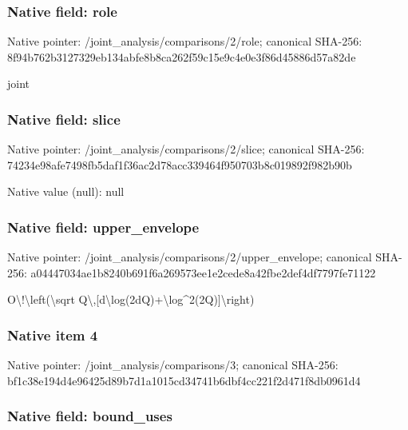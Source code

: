 \documentclass[10pt,a4paper]{article}
\begin{document}
\subsubsection{Native field: role}


Native pointer: /joint\_analysis/comparisons/2/role; canonical SHA-256: 8f94b762b3127329eb134abf\allowbreak{}e8b8ca262f59c15e9c4e0e3f\allowbreak{}86d45886d57a82de


joint


\subsubsection{Native field: slice}


Native pointer: /joint\_analysis/comparisons/2/slice; canonical SHA-256: 74234e98afe7498fb5daf1f3\allowbreak{}6ac2d78acc339464f950703b\allowbreak{}8c019892f982b90b



Native value (null): null



\subsubsection{Native field: upper\_envelope}


Native pointer: /joint\_analysis/comparis\allowbreak{}ons/2/upper\_envelope; canonical SHA-256: a04447034ae1b8240b691f6a\allowbreak{}269573ee1e2cede8a42fbe2d\allowbreak{}ef4df7797fe71122


O\textbackslash{}!\textbackslash{}left(\textbackslash{}sqrt Q\textbackslash{},[d\textbackslash{}log(2dQ)+\textbackslash{}log\textasciicircum{}2(2Q)]\textbackslash{}right)


\subsubsection{Native item 4}


Native pointer: /joint\_analysis/comparisons/3; canonical SHA-256: bf1c38e194d4e96425d89b7d\allowbreak{}1a1015cd34741b6dbf4cc221\allowbreak{}f2d471f8db0961d4



\subsubsection{Native field: bound\_uses}
\end{document}
